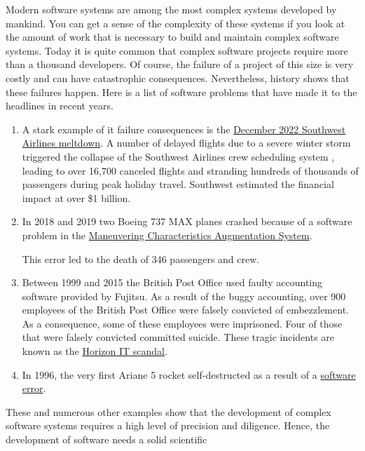 Modern software systems are among the most complex systems developed by mankind.  You can get a
sense of the complexity of these systems if you look at the amount of work that is necessary to
build and maintain complex software systems.  Today it is quite common that complex software projects require
more than a thousand developers.  Of course, the failure of a project of this size is very costly and can have
catastrophic consequences.  Nevertheless, history shows that these failures happen.
Here is a list of software problems that have made it to the headlines in recent years.
\begin{enumerate}
\item A stark example of \gls{it} failure consequences is the
      \href{https://www.npr.org/2023/01/26/1151667801/southwest-airlines-investigation-losses-holiday-travel-cancellations}{December 2022 Southwest Airlines meltdown}.
      A number of delayed flights due to a severe winter storm triggered the collapse of the Southwest Airlines
      crew scheduling system , leading to over 16,700 
      canceled flights and stranding hundreds of thousands of passengers during peak holiday travel. Southwest
      estimated the financial impact at over \$1 billion. 
\item In 2018 and 2019 two Boeing 737 MAX planes crashed because of a software problem in the
      \href{https://en.wikipedia.org/wiki/Maneuvering_Characteristics_Augmentation_System}{Maneuvering
        Characteristics Augmentation System}.
      
      This error led to the death of 346 passengers and crew.
\item Between 1999 and 2015 the British Post Office used faulty accounting software provided by Fujitsu.
      As a result of the buggy accounting, over 900 employees of the British Post Office were falsely
      convicted of embezzlement.  As a consequence, some of these employees were imprisoned.  Four of those
      that were falsely convicted committed suicide.  These tragic incidents are known as the
      \href{https://en.wikipedia.org/wiki/British_Post_Office_scandal}{Horizon IT scandal}.     
\item In 1996, the very first Ariane 5 rocket self-destructed as a result of a
      \href{https://www.bugsnag.com/blog/bug-day-ariane-5-disaster/}{software error}. 
\end{enumerate}
These and numerous other examples show that the development of complex software systems requires a high level
of precision and diligence.  Hence, the development of software needs a solid scientific
